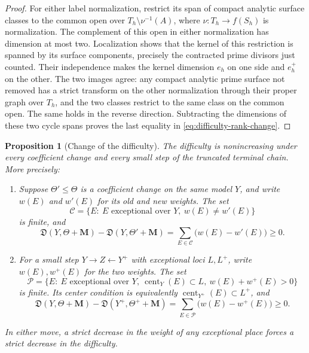 \documentclass[11pt]{amsart}
\newtheorem{proposition}[theorem]{Proposition}
\theoremstyle{definition}
\theoremstyle{remark}
\numberwithin{equation}{section}
\newcommand{\M}{\mathbf{M}}
\DeclareMathOperator{\cent}{cent}
\begin{document}
\begin{proof}
For either label normalization, restrict its span of compact analytic
surface classes to the common open over \(T_h\setminus\nu^{-1}(A)\),
where \(\nu:T_h\to f(S_h)\) is normalization.  The complement of this
open in either normalization has dimension at most two.  Localization shows that the kernel of this
restriction is spanned by its surface components, precisely the contracted
prime divisors just counted.  Their independence makes the kernel dimension
\(e_h\) on one side and \(e_h^+\) on the other.  The two images agree:
any compact analytic prime surface not removed has a strict transform on
the other normalization through their proper graph over \(T_h\), and the
two classes restrict to the same class on the common open.  The same holds
in the reverse direction.  Subtracting the dimensions of these two cycle
spans proves the last equality in \eqref{eq:difficulty-rank-change}.
\end{proof}

\begin{proposition}[Change of the difficulty]\label{prop:difficulty-change}
The difficulty is nonincreasing under every coefficient change and every
small step of the truncated terminal chain.  More precisely:
\begin{enumerate}
\item Suppose \(\Theta'\leq\Theta\) is a coefficient change on the same
model \(Y\), and write \(w(E)\) and \(w'(E)\) for its old and new weights.
The set
\[
 \mathcal C=\{E:\ E\text{ exceptional over }Y,\ w(E)\ne w'(E)\}
\]
is finite, and
\begin{equation}\label{eq:difficulty-coefficient-change}
 \mathfrak D(Y,\Theta+\M)-\mathfrak D(Y,\Theta'+\M)
 =\sum_{E\in\mathcal C}\bigl(w(E)-w'(E)\bigr)\geq0.
\end{equation}
\item For a small step \(Y\to Z\leftarrow Y^+\) with exceptional loci
\(L,L^+\), write \(w(E),w^+(E)\) for the two weights.  The set
\[
 \mathcal P=\{E:\ E\text{ exceptional over }Y,\
       \cent_Y(E)\subset L,\ w(E)+w^+(E)>0\}
\]
is finite.  Its center condition is equivalently
\(\cent_{Y^+}(E)\subset L^+\), and
\begin{equation}\label{eq:difficulty-small-change}
 \mathfrak D(Y,\Theta+\M)-\mathfrak D(Y^+,\Theta^++\M)
 =\sum_{E\in\mathcal P}\bigl(w(E)-w^+(E)\bigr)\geq0.
\end{equation}
\end{enumerate}
In either move, a strict decrease in the weight of any exceptional place
forces a strict decrease in the difficulty.
\end{proposition}
\end{document}

